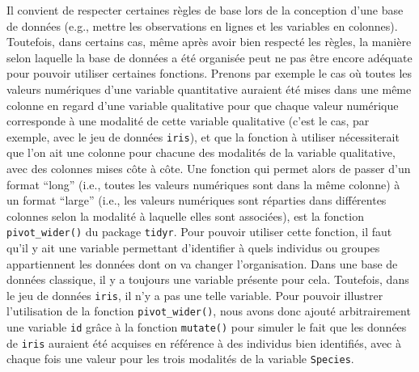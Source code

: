 \documentclass[
  french,
]{book}
\newenvironment{Shaded}{\begin{snugshade}}{\end{snugshade}}
\newcommand{\DataTypeTok}[1]{\textcolor[rgb]{0.13,0.29,0.53}{#1}}
\newcommand{\DecValTok}[1]{\textcolor[rgb]{0.00,0.00,0.81}{#1}}
\newcommand{\KeywordTok}[1]{\textcolor[rgb]{0.13,0.29,0.53}{\textbf{#1}}}
\newcommand{\NormalTok}[1]{#1}
\newcommand{\OperatorTok}[1]{\textcolor[rgb]{0.81,0.36,0.00}{\textbf{#1}}}
\newcommand{\StringTok}[1]{\textcolor[rgb]{0.31,0.60,0.02}{#1}}
\begin{document}
Il convient de respecter certaines règles de base lors de la conception d'une base de données (e.g., mettre les observations en lignes et les variables en colonnes). Toutefois, dans certains cas, même après avoir bien respecté les règles, la manière selon laquelle la base de données a été organisée peut ne pas être encore adéquate pour pouvoir utiliser certaines fonctions. Prenons par exemple le cas où toutes les valeurs numériques d'une variable quantitative auraient été mises dans une même colonne en regard d'une variable qualitative pour que chaque valeur numérique corresponde à une modalité de cette variable qualitative (c'est le cas, par exemple, avec le jeu de données \texttt{iris}), et que la fonction à utiliser nécessiterait que l'on ait une colonne pour chacune des modalités de la variable qualitative, avec des colonnes mises côte à côte. Une fonction qui permet alors de passer d'un format ``long'' (i.e., toutes les valeurs numériques sont dans la même colonne) à un format ``large'' (i.e., les valeurs numériques sont réparties dans différentes colonnes selon la modalité à laquelle elles sont associées), est la fonction \texttt{pivot\_wider()} du package \texttt{tidyr}. Pour pouvoir utiliser cette fonction, il faut qu'il y ait une variable permettant d'identifier à quels individus ou groupes appartiennent les données dont on va changer l'organisation. Dans une base de données classique, il y a toujours une variable présente pour cela. Toutefois, dans le jeu de données \texttt{iris}, il n'y a pas une telle variable. Pour pouvoir illustrer l'utilisation de la fonction \texttt{pivot\_wider()}, nous avons donc ajouté arbitrairement une variable \texttt{id} grâce à la fonction \texttt{mutate()} pour simuler le fait que les données de \texttt{iris} auraient été acquises en référence à des individus bien identifiés, avec à chaque fois une valeur pour les trois modalités de la variable \texttt{Species}.

\begin{Shaded}
\end{Shaded}
\end{document}
